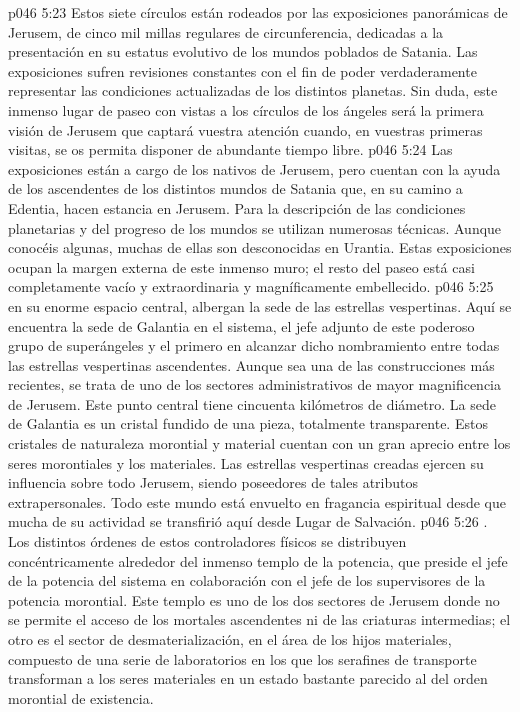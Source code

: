 \vs p046 5:23 Estos siete círculos están rodeados por las exposiciones panorámicas de Jerusem, de cinco mil millas regulares de circunferencia, dedicadas a la presentación en su estatus evolutivo de los mundos poblados de Satania. Las exposiciones sufren revisiones constantes con el fin de poder verdaderamente representar las condiciones actualizadas de los distintos planetas. Sin duda, este inmenso lugar de paseo con vistas a los círculos de los ángeles será la primera visión de Jerusem que captará vuestra atención cuando, en vuestras primeras visitas, se os permita disponer de abundante tiempo libre.
\vs p046 5:24 Las exposiciones están a cargo de los nativos de Jerusem, pero cuentan con la ayuda de los ascendentes de los distintos mundos de Satania que, en su camino a Edentia, hacen estancia en Jerusem. Para la descripción de las condiciones planetarias y del progreso de los mundos se utilizan numerosas técnicas. Aunque conocéis algunas, muchas de ellas son desconocidas en Urantia. Estas exposiciones ocupan la margen externa de este inmenso muro; el resto del paseo está casi completamente vacío y extraordinaria y magníficamente embellecido.
\vs p046 5:25  en su enorme espacio central, albergan la sede de las estrellas vespertinas. Aquí se encuentra la sede de Galantia en el sistema, el jefe adjunto de este poderoso grupo de superángeles y el primero en alcanzar dicho nombramiento entre todas las estrellas vespertinas ascendentes. Aunque sea una de las construcciones más recientes, se trata de uno de los sectores administrativos de mayor magnificencia de Jerusem. Este punto central tiene cincuenta kilómetros de diámetro. La sede de Galantia es un cristal fundido de una pieza, totalmente transparente. Estos cristales de naturaleza morontial y material cuentan con un gran aprecio entre los seres morontiales y los materiales. Las estrellas vespertinas creadas ejercen su influencia sobre todo Jerusem, siendo poseedores de tales atributos extrapersonales. Todo este mundo está envuelto en fragancia espiritual desde que mucha de su actividad se transfirió aquí desde Lugar de Salvación.
\vs p046 5:26 . Los distintos órdenes de estos controladores físicos se distribuyen concéntricamente alrededor del inmenso templo de la potencia, que preside el jefe de la potencia del sistema en colaboración con el jefe de los supervisores de la potencia morontial. Este templo es uno de los dos sectores de Jerusem donde no se permite el acceso de los mortales ascendentes ni de las criaturas intermedias; el otro es el sector de desmaterialización, en el área de los hijos materiales, compuesto de una serie de laboratorios en los que los serafines de transporte transforman a los seres materiales en un estado bastante parecido al del orden morontial de existencia.
